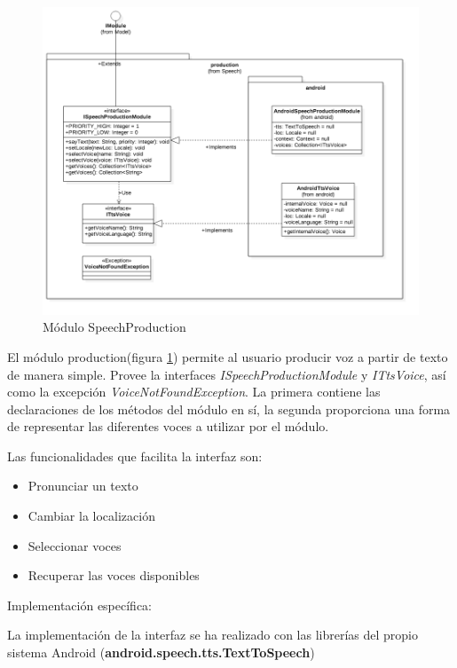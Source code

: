 \begin{figure}
	\centering
	\includegraphics[width=1\linewidth]{imagenes/diagramas/SpeechProductionModule.png}
	\caption{Módulo SpeechProduction}
	\label{fig:speech-production-module}
\end{figure}




El módulo production(figura \ref{fig:speech-production-module}) permite al usuario producir voz a partir de texto de manera simple.
Provee la interfaces \textit{ISpeechProductionModule} y \textit{ITtsVoice}, así como la excepción \textit{VoiceNotFoundException}.
La primera contiene las declaraciones de los métodos del módulo en sí, la segunda proporciona una forma de representar las diferentes voces a utilizar por el módulo.

Las funcionalidades que facilita la interfaz son:

\begin{itemize}
	\item Pronunciar un texto
	\item Cambiar la localización 
	\item Seleccionar voces
	\item Recuperar las voces disponibles
\end{itemize}

 


Implementación específica:

La implementación de la interfaz se ha realizado con las librerías del propio sistema Android (\textbf{android.speech.tts.TextToSpeech})

